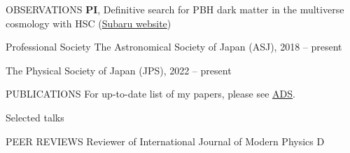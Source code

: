 \documentclass{sty/resume} %
\begin{document}
\begin{rSection}{OBSERVATIONS}
    \textbf{PI}, Definitive search for PBH dark matter in the multiverse cosmology with HSC (\href{https://subarutelescope.org/Observing/Schedule/S20B_abstract/S20B0032abst.html}{Subaru website})
\end{rSection}

\begin{rSection}{Professional Society}
    The Astronomical Society of Japan (ASJ), 2018 -- present

    The Physical Society of Japan (JPS), 2022 -- present
\end{rSection}

\clearpage
\begin{rSection}{PUBLICATIONS}
    For up-to-date list of my papers, please see \href{https://ui.adsabs.harvard.edu/search/filter_author_facet_hier_fq_author=AND&filter_author_facet_hier_fq_author=author_facet_hier%3A%221%2FSugiyama%2C%20S%2FSugiyama%2C%20Sunao%22&fq=%7B!type%3Daqp%20v%3D%24fq_author%7D&fq_author=(author_facet_hier%3A%221%2FSugiyama%2C%20S%2FSugiyama%2C%20Sunao%22)&q=pubdate%3A%5B2001-01%20TO%209999-12%5D%20author%3A(%22Sugiyama%2CSunao%22)&sort=date%20desc%2C%20bibcode%20desc&p_=0}{ADS}.
    \vspace{-19em}
    
    
\end{rSection}

\begin{rSection}{Selected talks}
    
\end{rSection}

\begin{rSection}{PEER REVIEWS}
    Reviewer of International Journal of Modern Physics D
\end{rSection}
\end{document}
